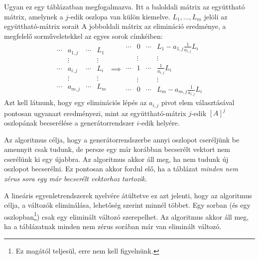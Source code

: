 \documentclass[a4paper, showtrims]{memoir}
\theoremstyle{plain}
\theoremstyle{remark}
\theoremstyle{definition}
\begin{document}
Ugyan ez egy táblázatban megfogalmazva.
Itt a baloldali mátrix az együttható mátrix, amelynek
a $j$-edik oszlopa van külön kiemelve.
$L_1,\ldots,L_m$ jelöli az együttható-mátrix sorait
A jobboldali mátrix az elimináció eredménye, a megfelelő sorműveletekkel az egyes sorok
címkéiben:
\[
	\begin{array}{ccc|c}
		\cdots & a_{1,j}         & \cdots & L_1    \\
		       & \vdots          &        & \vdots \\
		\cdots & \boxed{a_{i,j}} & \cdots & L_i    \\
		       & \vdots          &        & \vdots \\
		\cdots & a_{m,j}         & \cdots & L_m
	\end{array}
	\implies
	\begin{array}{ccc|c}
		\cdots & 0      & \cdots & L_1-a_{1,j}\frac{1}{a_{i,j}}L_i \\
		       & \vdots &        & \vdots                          \\
		\cdots & 1      & \cdots & \frac{1}{a_{i,j}}L_i            \\
		       & \vdots &        & \vdots                          \\
		\cdots & 0      & \cdots & L_m-a_{m,j}\frac{1}{a_{i,j}}L_i
	\end{array}
\]
Azt kell látnunk, hogy egy eliminációs lépés az $a_{i,j}$ pivot elem választásával pontosan ugyanazt eredményezi,
mint az együttható-mátrix $j$-edik $\left[ A \right]^j$ oszlopának becserélése a generátorrendszer $i$-edik helyére.

Az algoritmus célja, hogy
a generátorrendszerbe annyi oszlopot cseréljünk be amennyit csak tudunk,
de persze egy már korábban becserélt vektort nem cserélünk ki egy újabbra.
Az algoritmus akkor áll meg, ha nem tudunk új oszlopot becserélni.
Ez pontosan akkor fordul elő,
ha a táblázat \emph{minden nem zérus sora egy már becserélt vektorhoz tartozik.}


A lineáris egyenletrendszerek nyelvére átültetve ez azt jelenti,
hogy az algoritmus célja, a változók eliminálása, lehetőség szerint minnél többet.
Egy sorban (és egy oszlopban\footnote{Ez magától teljesül, erre nem kell figyelnünk.}) csak egy eliminált változó szerepelhet.
Az algoritmus akkor áll meg,
ha a táblázatnak minden nem zérus sorában már van eliminált változó.
\end{document}
